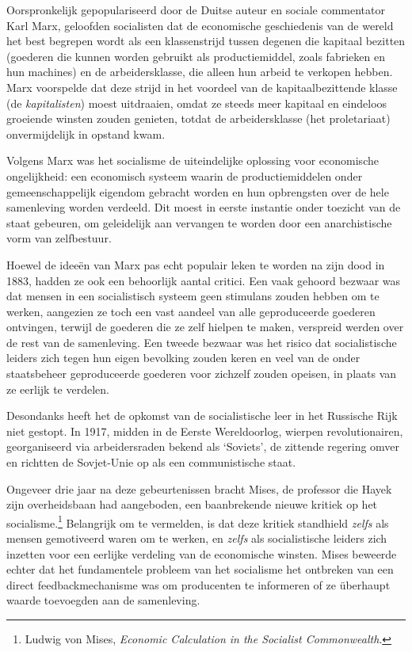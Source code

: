 \documentclass[
  a5paper,
  smalldemyvopaper,11pt,twoside,onecolumn,openright,extrafontsizes,
hidelinks]{memoir}
\begin{document}
Oorspronkelijk gepopulariseerd door de Duitse auteur en sociale
commentator Karl Marx, geloofden socialisten dat de economische
geschiedenis van de wereld het best begrepen wordt als een klassenstrijd
tussen degenen die kapitaal bezitten (goederen die kunnen worden
gebruikt als productiemiddel, zoals fabrieken en hun machines) en de
arbeidersklasse, die alleen hun arbeid te verkopen hebben. Marx
voorspelde dat deze strijd in het voordeel van de kapitaalbezittende
klasse (de \emph{kapitalisten}) moest uitdraaien, omdat ze steeds meer
kapitaal en eindeloos groeiende winsten zouden genieten, totdat de
arbeidersklasse (het proletariaat) onvermijdelijk in opstand kwam.

Volgens Marx was het socialisme de uiteindelijke oplossing voor
economische ongelijkheid: een economisch systeem waarin de
productiemiddelen onder gemeenschappelijk eigendom gebracht worden en
hun opbrengsten over de hele samenleving worden verdeeld. Dit moest in
eerste instantie onder toezicht van de staat gebeuren, om geleidelijk
aan vervangen te worden door een anarchistische vorm van zelfbestuur.

Hoewel de ideeën van Marx pas echt populair leken te worden na zijn dood
in 1883, hadden ze ook een behoorlijk aantal critici. Een vaak gehoord
bezwaar was dat mensen in een socialistisch systeem geen stimulans
zouden hebben om te werken, aangezien ze toch een vast aandeel van alle
geproduceerde goederen ontvingen, terwijl de goederen die ze zelf
hielpen te maken, verspreid werden over de rest van de samenleving. Een
tweede bezwaar was het risico dat socialistische leiders zich tegen hun
eigen bevolking zouden keren en veel van de onder staatsbeheer
geproduceerde goederen voor zichzelf zouden opeisen, in plaats van ze
eerlijk te verdelen.

Desondanks heeft het de opkomst van de socialistische leer in het
Russische Rijk niet gestopt. In 1917, midden in de Eerste Wereldoorlog,
wierpen revolutionairen, georganiseerd via arbeidersraden bekend als
`Soviets', de zittende regering omver en richtten de Sovjet-Unie op als
een communistische staat.

Ongeveer drie jaar na deze gebeurtenissen bracht Mises, de professor die
Hayek zijn overheidsbaan had aangeboden, een baanbrekende nieuwe kritiek
op het socialisme.\footnote{\hspace{0pt}Ludwig von Mises, \emph{Economic
  Calculation in the Socialist Commonwealth}.} Belangrijk om te
vermelden, is dat deze kritiek standhield \emph{zelfs} als mensen
gemotiveerd waren om te werken, en \emph{zelfs} als socialistische
leiders zich inzetten voor een eerlijke verdeling van de economische
winsten. Mises beweerde echter dat het fundamentele probleem van het
socialisme het ontbreken van een direct feedbackmechanisme was om
producenten te informeren of ze überhaupt waarde toevoegden aan de
samenleving.
\end{document}
